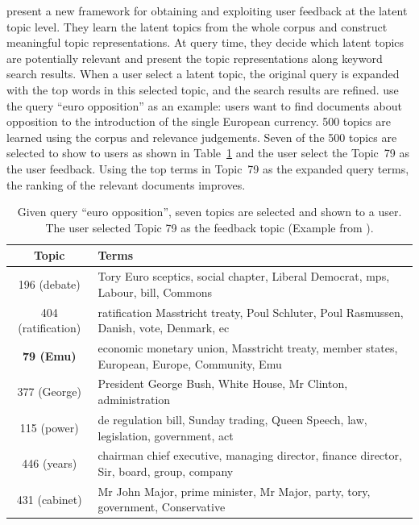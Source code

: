 \citet{Andrzejewski-2011} present a new framework for obtaining and
exploiting user feedback at the latent topic level. They learn the
latent topics from the whole corpus and construct meaningful topic
representations. At query time, they decide which latent topics are
potentially relevant and present the topic representations along
keyword search results. When a user select a latent topic, the
original query is expanded with the top words in this selected topic,
and the search results are refined. 
\citet{Andrzejewski-2011} use the query ``euro opposition'' as an example:
users want to find documents about opposition to the introduction of
the single European currency. 500 topics are learned using the corpus and relevance
judgements. Seven of the 500 topics are selected to show to users as shown in
Table~\ref{tab:topic-feedback} and the user select the Topic~79 as the user feedback.
Using the top terms in Topic~79 as the expanded query terms, the ranking of
the relevant documents improves.

\begin{table}[!tp]
\caption{Given query ``euro opposition'', seven topics are selected and shown to a user. The user selected Topic 79
as the feedback topic (Example from \citet{Andrzejewski-2011}).}
\label{tab:topic-feedback}
\begin{center}
\footnotesize
\setlength\tabcolsep{3pt}
\begin{tabular}{c  p{9cm} } \hline
\rowcolor{gray!50}
Topic & Terms \\ \hline \hline
196 (debate) & Tory Euro sceptics, social chapter, Liberal Democrat, mps, Labour, bill, Commons \\
404 (ratification) & ratification Masstricht treaty, Poul Schluter, Poul Rasmussen, Danish, vote, Denmark, ec \\
\textbf{79 (Emu)} & economic monetary union, Masstricht treaty, member states, European, Europe, Community, Emu \\
377 (George) & President George Bush, White House, Mr Clinton, administration \\
115 (power) & de regulation bill, Sunday trading, Queen Speech, law, legislation, government, act \\
446 (years) & chairman chief executive, managing director, finance director, Sir, board, group, company \\
431 (cabinet) & Mr John Major, prime minister, Mr Major, party, tory, government, Conservative \\
\hline
\end{tabular}
\end{center}
\end{table}

